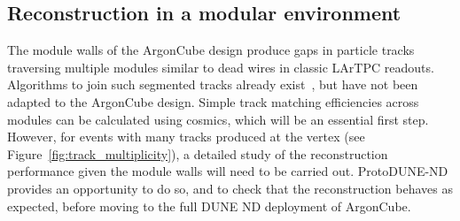 \FloatBarrier
\subsection{Reconstruction in a modular environment}
The module walls of the ArgonCube design produce gaps in particle tracks traversing multiple modules similar to dead wires in classic LArTPC readouts. Algorithms to join such segmented tracks already exist~\cite{pandora}, but have not been adapted to the ArgonCube design. Simple track matching efficiencies across modules can be calculated using cosmics, which will be an essential first step. However, for events with many tracks produced at the vertex (see Figure~\ref{fig:track_multiplicity}), a detailed study of the reconstruction performance given the module walls will need to be carried out. ProtoDUNE-ND provides an opportunity to do so, and to check that the reconstruction behaves as expected, before moving to the full DUNE ND deployment of ArgonCube.

